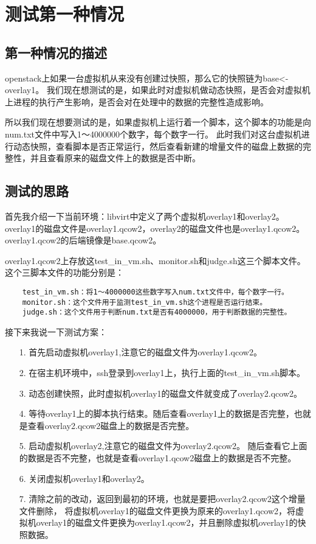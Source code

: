 \documentclass[a4paper,left=1.5cm,right=1.5cm,11pt]{article}
\begin{document}
\tableofcontents

\clearpage

\section{测试第一种情况}
\subsection{第一种情况的描述}
	openstack上如果一台虚拟机从来没有创建过快照，那么它的快照链为base<-overlay1。
	我们现在想测试的是，如果此时对虚拟机做动态快照，是否会对虚拟机上进程的执行产生影响，是否会对在处理中的数据的完整性造成影响。\par

	所以我们现在想要测试的是，如果虚拟机上运行着一个脚本，这个脚本的功能是向num.txt文件中写入1～4000000个数字，每个数字一行。
	此时我们对这台虚拟机进行动态快照，查看脚本是否正常运行，然后查看新建的增量文件的磁盘上数据的完整性，并且查看原来的磁盘文件上的数据是否中断。

\subsection{测试的思路}
	首先我介绍一下当前环境：libvirt中定义了两个虚拟机overlay1和overlay2。
	overlay1的磁盘文件是overlay1.qcow2，overlay2的磁盘文件也是overlay1.qcow2。
	overlay1.qcow2的后端镜像是base.qcow2。\par

	overlay1.qcow2上存放这test\_in\_vm.sh、monitor.sh和judge.sh这三个脚本文件。
	这个三脚本文件的功能分别是：
	\begin{lstlisting}
	test_in_vm.sh：将1～4000000这些数字写入num.txt文件中，每个数字一行。
	monitor.sh：这个文件用于监测test_in_vm.sh这个进程是否运行结束。
	judge.sh：这个文件用于判断num.txt是否有4000000，用于判断数据的完整性。
	\end{lstlisting}

	接下来我说一下测试方案：
	\begin{itemize}
		\item[1.] 首先启动虚拟机overlay1,注意它的磁盘文件为overlay1.qcow2。
		\item[2.] 在宿主机环境中，ssh登录到overlay1上，执行上面的test\_in\_vm.sh脚本。
		\item[3.] 动态创建快照，此时虚拟机overlay1的磁盘文件就变成了overlay2.qcow2。
		\item[4.] 等待overlay1上的脚本执行结束。随后查看overlay1上的数据是否完整，也就是查看overlay2.qcow2磁盘上的数据是否完整。
		\item[5.] 启动虚拟机overlay2,注意它的磁盘文件为overlay2.qcow2。
				  随后查看它上面的数据是否不完整，也就是查看overlay1.qcow2磁盘上的数据是否不完整。
		\item[6.] 关闭虚拟机overlay1和overlay2。
		\item[7.] 清除之前的改动，返回到最初的环境，也就是要把overlay2.qcow2这个增量文件删除，
		          将虚拟机overlay1的磁盘文件更换为原来的overlay1.qcow2，将虚拟机overlay1的磁盘文件更换为overlay1.qcow2，并且删除虚拟机overlay1的快照数据。
	\end{itemize}
\end{document}
